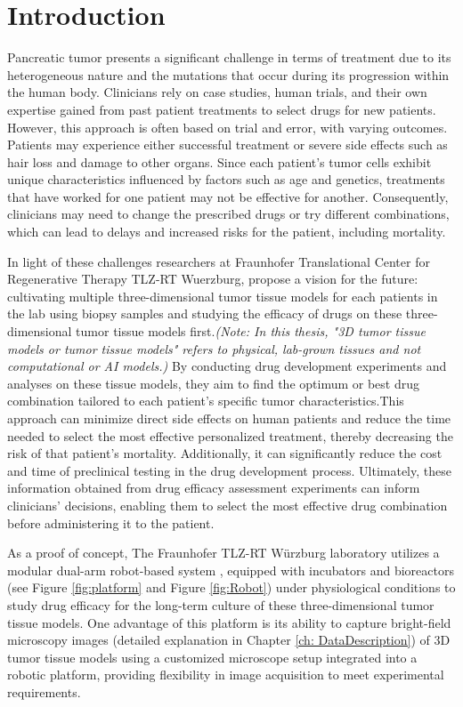 \chapter{Introduction}\label{ch:intro}

Pancreatic tumor presents a significant challenge in terms of treatment due to its heterogeneous nature and the mutations that occur during its progression
 within the human body. Clinicians rely on case studies, human trials, and their own expertise gained from past patient treatments to select drugs for new 
 patients. However, this approach is often based on trial and error, with varying outcomes. Patients may experience either successful treatment or severe 
 side effects such as hair loss and damage to other organs. Since each patient's tumor cells exhibit unique characteristics influenced by factors such as 
 age and genetics, treatments that have worked for one patient may not be effective for another. Consequently, clinicians may need to change the prescribed drugs or try different combinations, which can lead to delays and increased risks for the patient, including mortality.

In light of these challenges researchers at Fraunhofer Translational Center for Regenerative Therapy TLZ-RT Wuerzburg,  propose a vision for the future: 
cultivating multiple three-dimensional tumor tissue models for each patients in the lab using biopsy samples and studying the efficacy of drugs on these 
three-dimensional tumor tissue models first.\textit{(Note: In this thesis, "3D tumor tissue models or tumor tissue models" refers to physical, lab-grown
 tissues and not computational or AI models.)} By conducting drug development experiments and analyses on these tissue models, they aim to find the optimum 
 or best drug combination tailored to each patient's specific tumor characteristics.This approach can minimize direct side effects on human patients and 
 reduce the time needed to select the most effective personalized treatment, thereby decreasing the risk of that patient's mortality. Additionally, it can 
 significantly reduce the cost and time of preclinical testing in the drug development process. Ultimately, these information obtained from drug efficacy 
  assessment experiments can inform clinicians' decisions, enabling them to select the most effective drug combination before administering it to the patient.

As a proof of concept, The Fraunhofer TLZ-RT Würzburg laboratory utilizes a modular dual-arm robot-based system \cite{Dembski2023Establishing}, equipped 
with incubators and bioreactors (see Figure \ref{fig:platform} and Figure \ref{fig:Robot}) under physiological conditions to study drug efficacy for the
 long-term culture of these three-dimensional tumor tissue models. One advantage of this platform is its ability to capture bright-field microscopy images 
 (detailed explanation in Chapter \ref{ch: DataDescription}) of 3D tumor tissue models using a customized microscope setup integrated into a robotic 
 platform, providing flexibility in image acquisition to meet experimental requirements.

